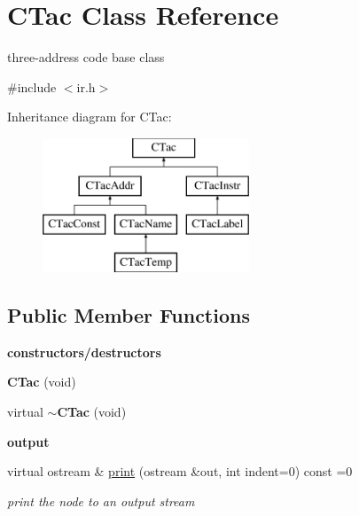 \hypertarget{classCTac}{\section{C\-Tac Class Reference}
\label{classCTac}
}


three-\/address code base class  




{\ttfamily \#include $<$ir.\-h$>$}

Inheritance diagram for C\-Tac\-:\begin{figure}[H]
\begin{center}
\leavevmode
\includegraphics[height=4.000000cm]{classCTac}
\end{center}
\end{figure}
\subsection*{Public Member Functions}
\begin{Indent}{\bf constructors/destructors}\par
\begin{DoxyCompactItemize}
\item 
\hypertarget{classCTac_abafa03b58c99606446cf53e46f1f38b8}{{\bfseries C\-Tac} (void)}\label{classCTac_abafa03b58c99606446cf53e46f1f38b8}

\item 
\hypertarget{classCTac_a9898a1125bc9cd6e6c6cca1dfa6edd47}{virtual {\bfseries $\sim$\-C\-Tac} (void)}\label{classCTac_a9898a1125bc9cd6e6c6cca1dfa6edd47}

\end{DoxyCompactItemize}
\end{Indent}
\begin{Indent}{\bf output}\par
\begin{DoxyCompactItemize}
\item 
virtual ostream \& \hyperlink{classCTac_ab8aa1795fb3d4253faf47e760f2a9372}{print} (ostream \&out, int indent=0) const =0
\begin{DoxyCompactList}\small\item\em print the node to an output stream \end{DoxyCompactList}\end{DoxyCompactItemize}
\end{Indent}


